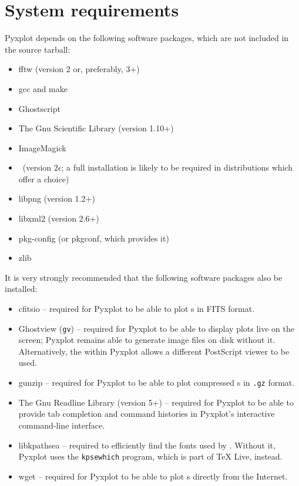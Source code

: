 \section{System requirements}

Pyxplot depends on the following software packages, which are not included in
the source tarball:

\vspace{0.5cm}
\begin{itemize}
\item fftw (version 2 or, preferably, 3+) 
\item gcc and make
\item Ghostscript 
\item The Gnu Scientific Library (version 1.10+) 
\item ImageMagick 
\item \latexdcf\ (version $2\epsilon$; a full installation is likely to be required in distributions which offer a choice) 
\item libpng (version 1.2+) 
\item libxml2 (version 2.6+) 
\item pkg-config (or pkgconf, which provides it) 
\item zlib 
\end{itemize}
\vspace{0.5cm}

\noindent It is very strongly recommended that the following software packages
also be installed:

\vspace{0.5cm}
\begin{itemize}
\item cfitsio -- required for Pyxplot to be able to plot \datafile s in FITS format.
\item Ghostview  ({\tt gv}) -- required for Pyxplot to be able to display plots live on the screen; Pyxplot remains able to generate image files on disk without it. Alternatively, the  within Pyxplot allows a different PostScript viewer to be used.
\item gunzip  -- required for Pyxplot to be able to plot compressed \datafile s in {\tt .gz} format.
\item The Gnu Readline Library (version 5+)  -- required for Pyxplot to be able to provide tab completion and command histories in Pyxplot's interactive command-line interface.
\item libkpathsea  -- required to efficiently find the fonts used by \latexdcf. Without it, Pyxplot uses the {\tt kpsewhich} program, which is part of TeX Live, instead.
\item wget  -- required for Pyxplot to be able to plot \datafile s directly from the Internet.
\end{itemize}
\vspace{0.5cm}


